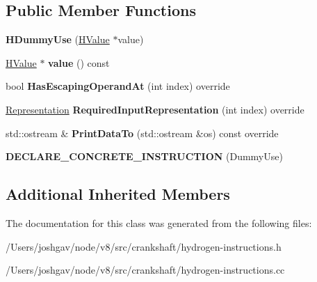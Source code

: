 \subsection*{Public Member Functions}
\begin{DoxyCompactItemize}
\item 
{\bfseries H\+Dummy\+Use} (\hyperlink{classv8_1_1internal_1_1_h_value}{H\+Value} $\ast$value)\hypertarget{classv8_1_1internal_1_1_h_dummy_use_a166f2c84668661ebe2b6cfb421130b36}{}\label{classv8_1_1internal_1_1_h_dummy_use_a166f2c84668661ebe2b6cfb421130b36}

\item 
\hyperlink{classv8_1_1internal_1_1_h_value}{H\+Value} $\ast$ {\bfseries value} () const \hypertarget{classv8_1_1internal_1_1_h_dummy_use_aba367c6440b62b495add3dd4a5103bf3}{}\label{classv8_1_1internal_1_1_h_dummy_use_aba367c6440b62b495add3dd4a5103bf3}

\item 
bool {\bfseries Has\+Escaping\+Operand\+At} (int index) override\hypertarget{classv8_1_1internal_1_1_h_dummy_use_ab5dbe2d4dad2c63d4b8de4e3148d776c}{}\label{classv8_1_1internal_1_1_h_dummy_use_ab5dbe2d4dad2c63d4b8de4e3148d776c}

\item 
\hyperlink{classv8_1_1internal_1_1_representation}{Representation} {\bfseries Required\+Input\+Representation} (int index) override\hypertarget{classv8_1_1internal_1_1_h_dummy_use_a94c7d16fe36c30a2444e2fa4ecd7eb07}{}\label{classv8_1_1internal_1_1_h_dummy_use_a94c7d16fe36c30a2444e2fa4ecd7eb07}

\item 
std\+::ostream \& {\bfseries Print\+Data\+To} (std\+::ostream \&os) const  override\hypertarget{classv8_1_1internal_1_1_h_dummy_use_a3873a6d4ceb3f6b1678a548418e495c7}{}\label{classv8_1_1internal_1_1_h_dummy_use_a3873a6d4ceb3f6b1678a548418e495c7}

\item 
{\bfseries D\+E\+C\+L\+A\+R\+E\+\_\+\+C\+O\+N\+C\+R\+E\+T\+E\+\_\+\+I\+N\+S\+T\+R\+U\+C\+T\+I\+ON} (Dummy\+Use)\hypertarget{classv8_1_1internal_1_1_h_dummy_use_a1b15cb84bb773f6724cb93ad92b47d03}{}\label{classv8_1_1internal_1_1_h_dummy_use_a1b15cb84bb773f6724cb93ad92b47d03}

\end{DoxyCompactItemize}
\subsection*{Additional Inherited Members}


The documentation for this class was generated from the following files\+:\begin{DoxyCompactItemize}
\item 
/\+Users/joshgav/node/v8/src/crankshaft/hydrogen-\/instructions.\+h\item 
/\+Users/joshgav/node/v8/src/crankshaft/hydrogen-\/instructions.\+cc\end{DoxyCompactItemize}
